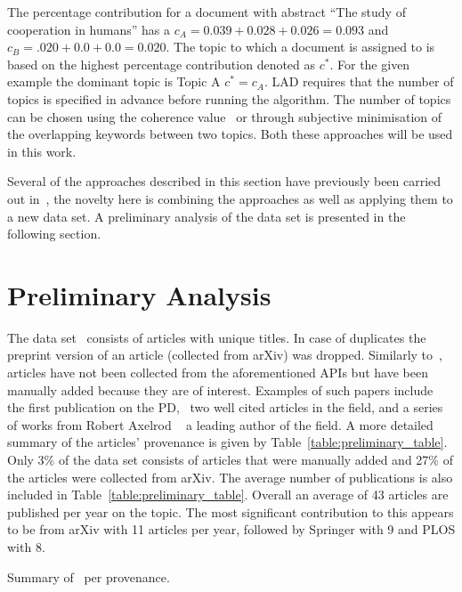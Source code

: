 \documentclass{article}
\theoremstyle{definition}
\newcommand{\totalarticles}{}
\newcommand{\manual}{}
\begin{document}
The percentage contribution for a document with abstract ``The study of
cooperation in humans'' has a \(c_{A} = 0.039 + 0.028 + 0.026 = 0.093\) and
\(c_B = .020 + 0.0 + 0.0 = 0.020\). The topic to which a document is assigned to
is based on the highest percentage contribution denoted as \(c^*\). For the
given example the dominant topic is Topic A \(c^*=c_A\). LAD requires that
the number of topics is specified in advance before running the algorithm. The
number of topics can be chosen using the coherence value~\cite{Roder2015} or
through subjective minimisation of the overlapping keywords between two topics.
Both these approaches will be used in this work.

Several of the approaches described in this section have previously been
carried out in~\cite{Bergmann2018,Liu2015,Sugimoto2011, youngblood2018},
the novelty here is combining the approaches as well as applying them
to a new data set. A preliminary analysis of the data set is presented in the
following section.

\section{Preliminary Analysis}\label{section:preliminary}

The data set~\cite{pd_data_2018} consists of \totalarticles articles with unique
titles. In case of duplicates the preprint version of an article (collected from
arXiv) was dropped. Similarly to~\cite{Liu2015}, \manual articles have not been
collected from the aforementioned APIs but have been manually added because they
are of interest. Examples of such papers include~\cite{Flood1958}
the first publication on the PD,~\cite{Ohtsuki2006, Stewart2012} two well cited
articles in the field, and a series of works from Robert Axelrod
~\cite{Axelrod1980, Axelrod1980more, Axelrod1987, Axelrod1981, Riolo2001} a
leading author of the field. A more detailed summary of the articles' provenance
is given by Table~\ref{table:preliminary_table}. Only 3\% of the data set consists of
articles that were manually added and 27\% of the articles were collected from
arXiv. The average number of publications is also included in
Table~\ref{table:preliminary_table}. Overall an average of 43 articles are published
per year on the topic. The most significant contribution to this appears to be
from arXiv with 11 articles per year, followed by Springer with 9 and PLOS with
8.

\begin{table}[!hbtp]
    \begin{center}
    \resizebox{.9\textwidth}{!}{
    }
    \end{center}
    \caption{Summary of~\cite{pd_data_2018} per provenance.}
    \label{table:preliminary_table}
\end{table}
\end{document}

